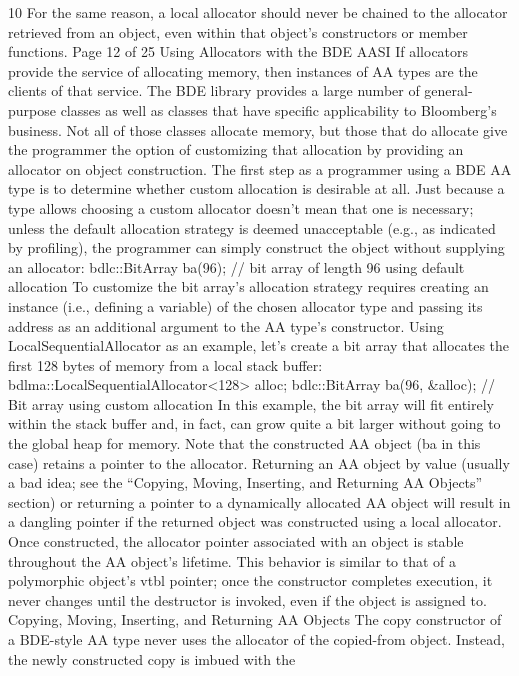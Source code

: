 10 For the same reason, a local allocator should never be chained to the allocator retrieved from
an object, even within that object’s constructors or member functions.
Page 12 of 25
Using Allocators with the BDE AASI
If allocators provide the service of allocating memory, then instances of AA
types are the clients of that service. The BDE library provides a large number of
general-purpose classes as well as classes that have specific applicability to
Bloomberg’s business. Not all of those classes allocate memory, but those that
do allocate give the programmer the option of customizing that allocation by
providing an allocator on object construction.
The first step as a programmer using a BDE AA type is to determine whether
custom allocation is desirable at all. Just because a type allows choosing a
custom allocator doesn’t mean that one is necessary; unless the default
allocation strategy is deemed unacceptable (e.g., as indicated by profiling), the
programmer can simply construct the object without supplying an allocator:
bdlc::BitArray ba(96); // bit array of length 96 using default allocation
To customize the bit array’s allocation strategy requires creating an instance
(i.e., defining a variable) of the chosen allocator type and passing its address as
an additional argument to the AA type’s constructor. Using
LocalSequentialAllocator as an example, let’s create a bit array that allocates
the first 128 bytes of memory from a local stack buffer:
bdlma::LocalSequentialAllocator<128> alloc;
bdlc::BitArray ba(96, &alloc); // Bit array using custom allocation
In this example, the bit array will fit entirely within the stack buffer and, in
fact, can grow quite a bit larger without going to the global heap for memory.
Note that the constructed AA object (ba in this case) retains a pointer to the
allocator. Returning an AA object by value (usually a bad idea; see the
“Copying, Moving, Inserting, and Returning AA Objects” section) or returning a
pointer to a dynamically allocated AA object will result in a dangling pointer if
the returned object was constructed using a local allocator.
Once constructed, the allocator pointer associated with an object is stable
throughout the AA object’s lifetime. This behavior is similar to that of a
polymorphic object’s vtbl pointer; once the constructor completes execution, it
never changes until the destructor is invoked, even if the object is assigned to.
Copying, Moving, Inserting, and Returning AA Objects
The copy constructor of a BDE-style AA type never uses the allocator of the
copied-from object. Instead, the newly constructed copy is imbued with the
